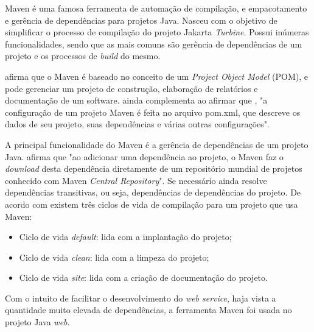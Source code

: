 	
	\par Maven é uma famosa ferramenta de automação de compilação, e empacotamento
e gerência de dependências para projetos Java. Nasceu com o objetivo de
simplificar o processo de compilação do projeto Jakarta \textit{Turbine}.
Possui inúmeras funcionalidades, sendo que as mais comuns são gerência de
dependências de um projeto e os processos de \textit{build} do mesmo.
	
	\par {} afirma que o Maven é baseado no conceito de
	um \textit{Project Object Model} (POM), e pode gerenciar um projeto de
construção, elaboração de relatórios e documentação de um software.
 ainda complementa ao afirmar que , "a configuração de
um projeto Maven é feita no arquivo pom.xml, que descreve os dados de seu
projeto, suas dependências e várias outras configurações".
	
	\par A principal funcionalidade do Maven é a gerência de dependências de um
projeto Java.  afirma que "ao adicionar uma dependência
ao projeto, o Maven faz o \textit{download} desta dependência diretamente de
um repositório mundial de projetos  conhecido com Maven \textit{Central
Repository}". Se necessário ainda resolve dependências transitivas, ou seja,
dependências de dependências do projeto. De acordo com
 existem três ciclos de vida de compilação para um
projeto que usa Maven:

	\begin{itemize}
		  \item Ciclo de vida \textit{default}: lida com a implantação do projeto;
		  \item Ciclo de vida \textit{clean}: lida com a limpeza do projeto;
		  \item Ciclo de vida \textit{site}: lida com a criação de documentação
		  do projeto.
	\end{itemize}
	
	\par Com o intuito de facilitar o desenvolvimento do \textit{web service},
haja vista a quantidade muito elevada de dependências, a ferramenta Maven foi
usada no projeto Java \textit{web}.
